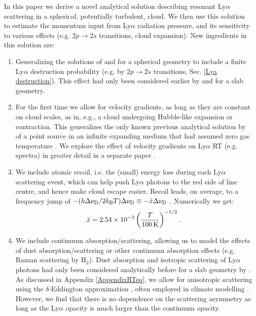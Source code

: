 \documentclass[fleqn,usenatbib]{mnras}
\begin{document}
In this paper we derive a novel analytical solution describing resonant Ly$\alpha$ scattering in a spherical, potentially turbulent, cloud. We then use this solution to estimate the momentum input from Ly$\alpha$ radiation pressure, and its sensitivity to various effects (e.g. $2p \rightarrow 2s$ transitions, cloud expansion). New ingredients in this solution are:
\begin{enumerate}
    \item Generalizing the solutions of \cite{Dijkstra2006} and \cite{Lao2020} for a spherical geometry to include a finite Ly$\alpha$ destruction probability (e.g. by $2p \rightarrow 2s$ transitions, Sec. \ref{Lya destruction}). This effect had only been considered earlier by \cite{Harrington1973} and \cite{Neufeld1990} for a slab geometry. \\
    
    \item For the first time we allow for velocity gradients, as long as they are constant on cloud scales, as in, e.g., a cloud undergoing Hubble-like expansion or contraction. This generalizes the only known previous analytical solution by \cite{Loeb1999} of a point source in an infinite expanding medium that had assumed zero gas temperature \citep[see also][]{Higgins2012}. We explore the effect of velocity gradients on Ly$\alpha$ RT (e.g. spectra) in greater detail in a separate paper \citep{Smith2025}. \\
    
    \item We include atomic recoil, i.e. the (small) energy loss during each Ly$\alpha$ scattering event, which can help push Ly$\alpha$ photons to the red side of line centre, and hence make cloud escape easier. Recoil leads, on average, to a frequency jump of $-(h \Delta\nu_{\rm D}/2k_{\rm B}T)\Delta\nu_{\rm D} \equiv -\Bar{x} \Delta \nu_{\rm D}$ \citep[see e.g. ][ and Appendix \ref{AppendixRTeq}]{Chuzhoy2006, Rybicki2006}. Numerically we get:
    \begin{equation}
        \Bar{x} = 2.54 \times 10^{-3} \left( \dfrac{T}{100\,\rm K} \right)^{-1/2} \hspace{1 pt} \label{xbar numerical}.
    \end{equation}
    
    \item We include continuum absorption/scattering, allowing us to model the effects of dust absorption/scattering or other continuum absorption effects (e.g. Raman scattering by H$_2$). Dust absorption and isotropic scattering of Ly$\alpha$ photons had only been considered analytically before for a slab geometry by \cite{Neufeld1990}. As discussed in Appendix \ref{AppendixRTeq}, we allow for anisotropic scattering using the $\delta$-Eddington approximation \citep{Joseph1976, Wiscombe1977}, often employed in climate modelling \citep[e.g.][]{NCAR1992}. However, we find that there is no dependence on the scattering asymmetry as long as the Ly$\alpha$ opacity is much larger than the continuum opacity. \\


\end{enumerate}
\end{document}
